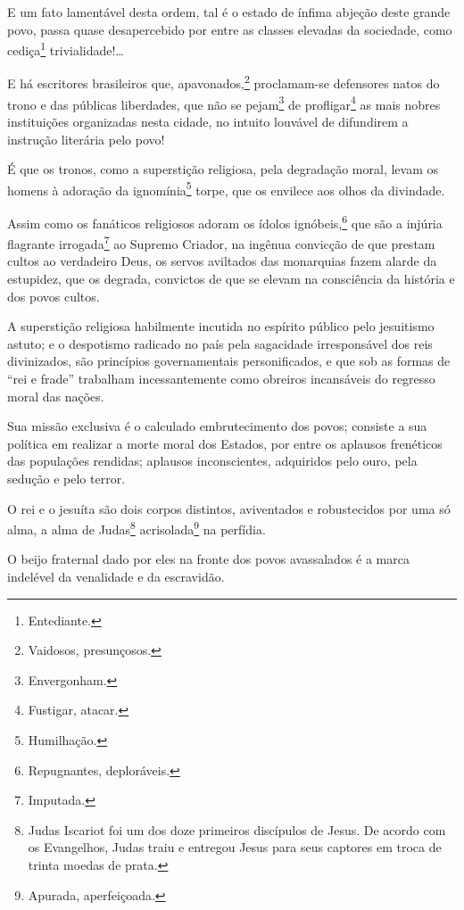 E um fato lamentável desta ordem, tal é o estado de ínfima abjeção deste
grande povo, passa quase desapercebido por entre as classes elevadas da
sociedade, como cediça\footnote{Entediante.} trivialidade!\ldots

E há escritores brasileiros que, apavonados,\footnote{Vaidosos,
  presunçosos.} proclamam-se defensores natos do trono e das públicas
liberdades, que não se pejam\footnote{Envergonham.} de
profligar\footnote{Fustigar, atacar.} as mais nobres instituições
organizadas nesta cidade, no intuito louvável de difundirem a instrução
literária pelo povo!

É que os tronos, como a superstição religiosa, pela degradação moral,
levam os homens à adoração da ignomínia\footnote{Humilhação.} torpe,
que os envilece aos olhos da divindade.

Assim como os fanáticos religiosos adoram os ídolos ignóbeis,\footnote{
  Repugnantes, deploráveis.} que são a injúria flagrante
irrogada\footnote{Imputada.} ao Supremo Criador, na ingênua convicção
de que prestam cultos ao verdadeiro Deus, os servos aviltados das
monarquias fazem alarde da estupidez, que os degrada, convictos de que
se elevam na consciência da história e dos povos cultos.

A superstição religiosa habilmente incutida no espírito público pelo
jesuitismo astuto; e o despotismo radicado no país pela sagacidade
irresponsável dos reis divinizados, são princípios governamentais
personificados, e que sob as formas de ``rei e frade'' trabalham
incessantemente como obreiros incansáveis do regresso moral das nações.

Sua missão exclusiva é o calculado embrutecimento dos povos; consiste a
sua política em realizar a morte moral dos Estados, por entre os
aplausos frenéticos das populações rendidas; aplausos inconscientes,
adquiridos pelo ouro, pela sedução e pelo terror.

O rei e o jesuíta são dois corpos distintos, aviventados e robustecidos
por uma só alma, a alma de Judas\footnote{Judas Iscariot foi um dos
  doze primeiros discípulos de Jesus. De acordo com os Evangelhos, Judas
  traiu e entregou Jesus para seus captores em troca de trinta moedas de
  prata.\label{judas}} acrisolada\footnote{Apurada, aperfeiçoada.} na perfídia.

O beijo fraternal dado por eles na fronte dos povos avassalados é a
marca indelével da venalidade e da escravidão.

